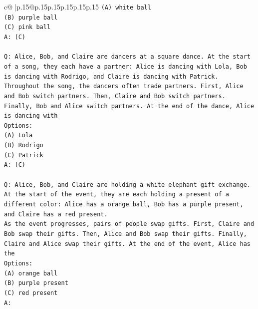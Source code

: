 \documentclass{article}
\begin{document}
{\begin{supertabular}{c@{$\;$}|p{.15\linewidth}@{}p{.15\linewidth}p{.15\linewidth}p{.15\linewidth}p{.15\linewidth}p{.15\linewidth}}
{{{\texttt{(A) white ball} \\
\texttt{(B) purple ball} \\
\texttt{(C) pink ball} \\
\texttt{A: (C)} \\
\\ 
\texttt{Q: Alice, Bob, and Claire are dancers at a square dance. At the start of a song, they each have a partner: Alice is dancing with Lola, Bob is dancing with Rodrigo, and Claire is dancing with Patrick.} \\
\texttt{Throughout the song, the dancers often trade partners. First, Alice and Bob switch partners. Then, Claire and Bob switch partners. Finally, Bob and Alice switch partners. At the end of the dance, Alice is dancing with} \\
\texttt{Options:} \\
\texttt{(A) Lola} \\
\texttt{(B) Rodrigo} \\
\texttt{(C) Patrick} \\
\texttt{A: (C)} \\
\\ 
\texttt{Q: Alice, Bob, and Claire are holding a white elephant gift exchange. At the start of the event, they are each holding a present of a different color: Alice has a orange ball, Bob has a purple present, and Claire has a red present.} \\
\texttt{As the event progresses, pairs of people swap gifts. First, Claire and Bob swap their gifts. Then, Alice and Bob swap their gifts. Finally, Claire and Alice swap their gifts. At the end of the event, Alice has the} \\
\texttt{Options:} \\
\texttt{(A) orange ball} \\
\texttt{(B) purple present} \\
\texttt{(C) red present} \\
\texttt{A:} \\
            }
        }
    }
     \\ \\


\end{supertabular}}
\end{document}
